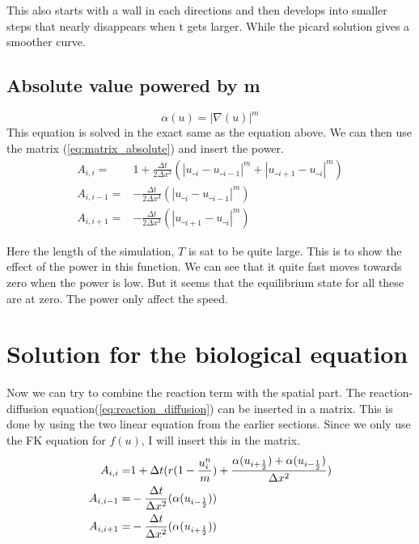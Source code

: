 \documentclass{article}
\begin{document}

This also starts with a wall in each directions and then develops into smaller steps that nearly disappears when t gets larger.
While the picard solution gives a smoother curve. 

\subsection{Absolute value powered by m}

\begin{equation}
	\alpha(u) = |\nabla(u)|^m
\end{equation}
This equation is solved in the exact same as the equation above. We can then use
the matrix (\ref{eq:matrix_absolute}) and insert the power.
\begin{align*} 
A_{i,i} =& 1+\frac{\Delta t}{2\Delta x^3}(\left|u\__i-u\__{i-1}\right|^m+ \left|u\__{i+1}-u\__i\right|^m)\\
A_{i,i-1} =&-\frac{\Delta t}{2\Delta x^3}(\left|u\__i-u\__{i-1}\right|^m)\\
A_{i,i+1} =&-\frac{\Delta t}{2\Delta x^3}(\left|u\__{i+1}-u\__i\right|^m)
\end{align*}


Here the length of the simulation, $T$ is sat to be quite large. This is to show the effect of the power in
this function. We can see that it quite fast moves towards zero when the power is low. But it seems that the equilibrium state for all these are at zero. The power only affect the speed.


\section{Solution for the biological equation}

Now we can try to combine the reaction term with the spatial part. The reaction-diffusion equation(\ref{eq:reaction_diffusion}) can be inserted in a matrix. This is done by using the two linear equation from the earlier sections.
Since we only use the FK equation for $f(u)$, I will insert this in the matrix.
\begin{align} \label{eq:matrix_reaction_diffusion}
A_{i,i} =& 1+\Delta t(r(1-\frac{u^n_i}{m})+\frac{\alpha(u_{i+\frac{1}{2}})+\alpha(u_{i-\frac{1}{2}})}{\Delta x^2})\notag\\
A_{i,i-1} =&-\frac{\Delta t}{\Delta x^2}(\alpha(u_{i-\frac{1}{2}}))\notag\\
A_{i,i+1} =&-\frac{\Delta t}{\Delta x^2}(\alpha(u_{i+\frac{1}{2}}))
\end{align}                               
\end{document}
